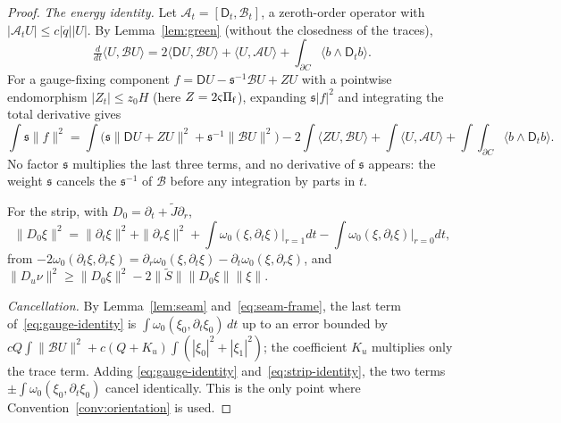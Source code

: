 \documentclass[11pt]{amsart}
\theoremstyle{definition}
\theoremstyle{remark}
\theoremstyle{plain}
\numberwithin{equation}{section}
\begin{document}
\begin{proof}
\emph{The energy identity.} Let $\mathcal A_t=[\mathsf D_t,\mathcal B_t]$,
a zeroth-order operator with $|\mathcal A_tU|\le c|\dot q||U|$. By
Lemma~\ref{lem:green} (without the closedness of the traces),
\[
\tfrac{d}{dt}\langle U,\mathcal BU\rangle
=2\langle\mathsf DU,\mathcal BU\rangle+\langle U,\mathcal AU\rangle
+\int_{\partial C}\langle b\wedge\mathsf D_tb\rangle .
\]
For a gauge-fixing component $f=\mathsf DU-{\mathfrak s}^{-1}\mathcal BU+ZU$ with a pointwise
endomorphism $|Z_t|\le z_0H$ (here $Z=2\varsigma\Pi_{\rm f}$), expanding ${\mathfrak s}|f|^2$ and
integrating the total derivative gives
\begin{equation}\label{eq:gauge-identity}
\int{\mathfrak s}\|f\|^2
=\int\bigl({\mathfrak s}\|\mathsf DU+ZU\|^2+{\mathfrak s}^{-1}\|\mathcal BU\|^2\bigr)
-2\!\int\!\langle ZU,\mathcal BU\rangle+\int\!\langle U,\mathcal AU\rangle
+\int\!\!\int_{\partial C}\!\langle b\wedge\mathsf D_tb\rangle .
\end{equation}
No factor ${\mathfrak s}$ multiplies the last three terms, and no derivative of
${\mathfrak s}$ appears: the weight ${\mathfrak s}$ cancels the ${\mathfrak s}^{-1}$ of
$\mathcal B$ before any integration by parts in $t$.

For the strip, with $D_0=\partial_t+\tilde J\partial_r$,
\begin{equation}\label{eq:strip-identity}
\|D_0\xi\|^2=\|\partial_t\xi\|^2+\|\partial_r\xi\|^2
+\int\omega_0(\xi,\partial_t\xi)\big|_{r=1}dt
-\int\omega_0(\xi,\partial_t\xi)\big|_{r=0}dt ,
\end{equation}
from $-2\omega_0(\partial_t\xi,\partial_r\xi)=\partial_r\omega_0(\xi,\partial_t\xi)
-\partial_t\omega_0(\xi,\partial_r\xi)$, and
$\|D_u\nu\|^2\ge\|D_0\xi\|^2-2\|\tilde S\|\|D_0\xi\|\|\xi\|$.

\emph{Cancellation.} By Lemma~\ref{lem:seam} and~\eqref{eq:seam-frame},
the last term of~\eqref{eq:gauge-identity} is
$\int\omega_0(\xi_0,\partial_t\xi_0)\,dt$ up to an error bounded by
$cQ\int\|\mathcal BU\|^2+c(Q+K_u)\int(|\xi_0|^2+|\xi_1|^2)$; the coefficient $K_u$
multiplies only the trace term. Adding
\eqref{eq:gauge-identity} and~\eqref{eq:strip-identity}, the two terms
$\pm\int\omega_0(\xi_0,\partial_t\xi_0)$ cancel identically. This is the
only point where Convention~\ref{conv:orientation} is used.


\end{proof}
\end{document}
